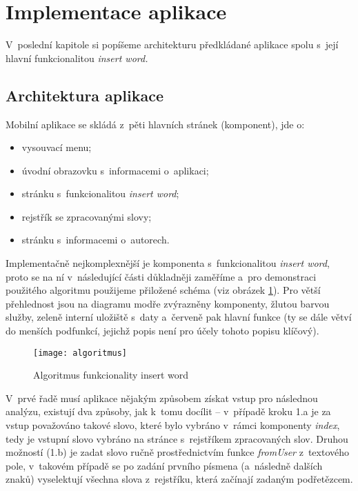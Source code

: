 \hypertarget{implementace-aplikace}{%
\section{Implementace aplikace}\label{implementace-aplikace}}

V~poslední kapitole si popíšeme architekturu předkládané aplikace spolu
s~její hlavní funkcionalitou \emph{insert word.}

\hypertarget{architektura-aplikace}{%
\subsection{Architektura aplikace}\label{architektura-aplikace}}

Mobilní aplikace se skládá z~pěti hlavních stránek (komponent), jde o:

\begin{itemize}
\tightlist
\item
  vysouvací menu;
\item
  úvodní obrazovku s~informacemi o~aplikaci;
\item
  stránku s~funkcionalitou \emph{insert word};
\item
  rejstřík se zpracovanými slovy;
\item
  stránku s~informacemi o~autorech.
\end{itemize}

Implementačně nejkomplexnější je komponenta s~funkcionalitou
\emph{insert word}, proto se na ní v~následující části důkladněji
zaměříme a~pro demonstraci použitého algoritmu použijeme přiložené
schéma (viz obrázek \ref{algoritmus}). Pro větší přehlednost jsou na
diagramu modře zvýrazněny komponenty, žlutou barvou služby, zeleně
interní uložiště s~daty a~červeně pak hlavní funkce (ty se dále větví do
menších podfunkcí, jejichž popis není pro účely tohoto popisu klíčový).

\begin{figure}[ht]   
    \centering
    \texttt{[image: algoritmus]}  
    \caption{Algoritmus funkcionality insert word}
    \label{algoritmus}
 \end{figure}

V~prvé řadě musí aplikace nějakým způsobem získat vstup pro následnou
analýzu, existují dva způsoby, jak k~tomu docílit -- v~případě kroku 1.a
je za vstup považováno takové slovo, které bylo vybráno v~rámci
komponenty \emph{index}, tedy je vstupní slovo vybráno na stránce
s~rejstříkem zpracovaných slov. Druhou možností (1.b) je zadat slovo ručně
prostřednictvím funkce \emph{fromUser} z~textového pole, v~takovém
případě se po zadání prvního písmena (a~následně dalších znaků)
vyselektují všechna slova z~rejstříku, která začínají zadaným
podřetězcem.


